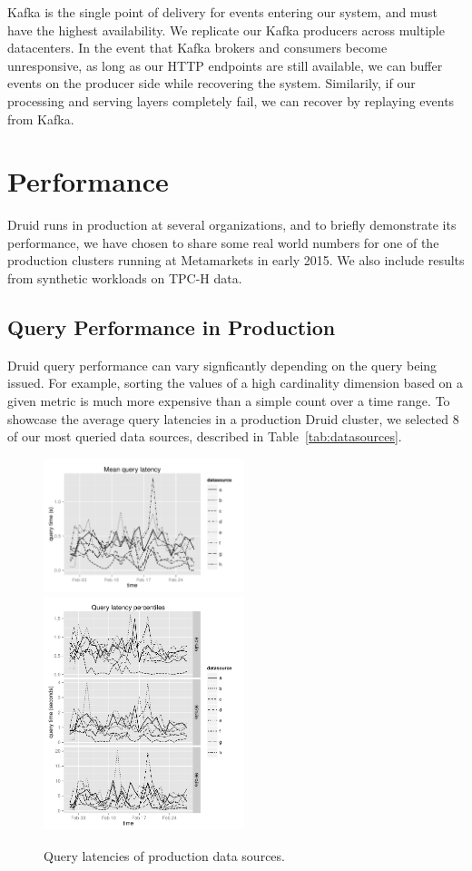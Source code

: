 \documentclass{vldb}
\begin{document}
Kafka is the single point of delivery for events entering our system, and must
have the highest availability. We replicate our Kafka producers across multiple
datacenters. In the event that Kafka brokers and consumers become unresponsive,
as long as our HTTP endpoints are still available, we can buffer events on the
producer side while recovering the system. Similarily, if our processing and
serving layers completely fail, we can recover by replaying events from Kafka.

\section{Performance}
\label{sec:performance}
Druid runs in production at several organizations, and to briefly demonstrate
its performance, we have chosen to share some real world numbers for one of the
production clusters running at Metamarkets in early 2015. We also include
results from synthetic workloads on TPC-H data.

\subsection{Query Performance in Production}
Druid query performance can vary signficantly depending on the query being
issued. For example, sorting the values of a high cardinality dimension based
on a given metric is much more expensive than a simple count over a time range.
To showcase the average query latencies in a production Druid cluster, we
selected 8 of our most queried data sources, described in
Table~\ref{tab:datasources}.

\begin{figure}
\centering
\includegraphics[width = 2.3in]{avg_query_latency}
\includegraphics[width = 2.3in]{query_percentiles}
\caption{Query latencies of production data sources.}
\label{fig:query_latency}
\end{figure}
\end{document}
